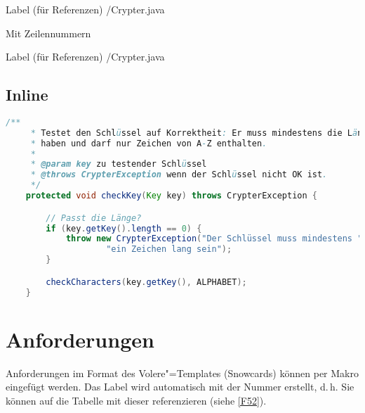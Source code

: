  Label (für Referenzen)
                 {\srcloc/Crypter.java}       %

Mit Zeilennummern

 Label (für Referenzen)
                 {\srcloc/Crypter.java}       %


\subsection{Inline}

\begin{lstlisting}[language=Java,caption=Methode checkKey()]
    /**
     * Testet den Schlüssel auf Korrektheit: Er muss mindestens die Länge 1
     * haben und darf nur Zeichen von A-Z enthalten.
     *
     * @param key zu testender Schlüssel
     * @throws CrypterException wenn der Schlüssel nicht OK ist.
     */
    protected void checkKey(Key key) throws CrypterException {

        // Passt die Länge?
        if (key.getKey().length == 0) {
            throw new CrypterException("Der Schlüssel muss mindestens " +
                    "ein Zeichen lang sein");
        }

        checkCharacters(key.getKey(), ALPHABET);
    }
\end{lstlisting}


\section{Anforderungen}

Anforderungen im Format des Volere"=Templates (Snowcards) \autocite{Volere} können per Makro eingefügt werden. Das Label wird automatisch mit der Nummer erstellt, d.\,h. Sie können auf die Tabelle mit dieser referenzieren (siehe \autoref{F52}).

